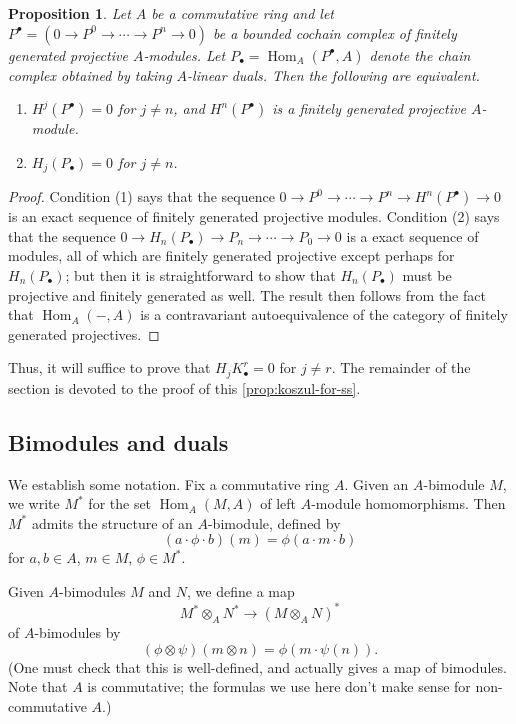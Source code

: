 \documentclass[11pt]{amsart}
\numberwithin{equation}{section}
\theoremstyle{plain}
\newtheorem{prop}[subsection]{Proposition}
\theoremstyle{remark}
\theoremstyle{plain}
\begin{document}
\begin{prop}\label{prop:dual-formulation}
Let $A$ be a commutative ring and let
$P^\bullet=(0{\rightarrow} P^0{\rightarrow}\cdots {\rightarrow} P^n{\rightarrow}0)$ be  a bounded cochain
complex of finitely generated 
projective $A$-modules.  Let $P_\bullet={{\operatorname{Hom}}}_A(P^\bullet,A)$ denote
the chain complex obtained by taking $A$-linear duals.
Then the following are equivalent.
\begin{enumerate}
\item $H^j(P^\bullet)=0$ for $j\neq n$, and $H^n(P^\bullet)$ is a
  finitely generated projective $A$-module.
\item $H_j(P_\bullet)=0$ for $j\neq n$.
\end{enumerate}
\end{prop}
\begin{proof}
Condition (1) says that the sequence $0{\rightarrow} P^0{\rightarrow} \cdots {\rightarrow} P^n{\rightarrow}
H^n(P^\bullet){\rightarrow} 0$ is an exact sequence of finitely generated
projective modules. 
Condition (2) says that the sequence $0{\rightarrow} H_n(P_\bullet){\rightarrow} P_n{\rightarrow}
\cdots {\rightarrow} P_0{\rightarrow} 0$ is a exact sequence of modules, all of which are
finitely generated projective except perhaps for $H_n(P_\bullet)$; but
then it is 
straightforward to show that $H_n(P_\bullet)$ must be projective and
finitely generated  as well.  The result then follows from the fact
that ${{\operatorname{Hom}}}_A({-},A)$ is a contravariant autoequivalence of the
category of finitely generated projectives.
\end{proof}

Thus, it will suffice to prove that $H_jK_\bullet^r=0$ for $j\neq r$.
The remainder of the section is devoted to the proof of this
\eqref{prop:koszul-for-ss}. 

\subsection{Bimodules and duals}
We establish some notation.  Fix a commutative ring $A$.  Given
an $A$-bimodule $M$, we write $M^*$ for the set ${{\operatorname{Hom}}}_A(M,A)$ of left
$A$-module homomorphisms.  Then $M^*$ admits the structure of an
$A$-bimodule, defined by
\[
(a\cdot \phi\cdot b)(m)=\phi(a\cdot m\cdot b)
\]
for $a,b\in A$, $m\in M$, $\phi\in M^*$.

Given $A$-bimodules $M$ and $N$, we define a map
\[
M^*\otimes_A N^* {\rightarrow} (M\otimes_A N)^*
\]
of $A$-bimodules by 
\[
(\phi\otimes\psi)(m\otimes n) = \phi(m\cdot \psi(n)).
\]
(One must check that this is well-defined, and actually gives a map of
bimodules.  Note that $A$ is commutative; the formulas we use here
don't make sense for non-commutative $A$.)  
\end{document}
